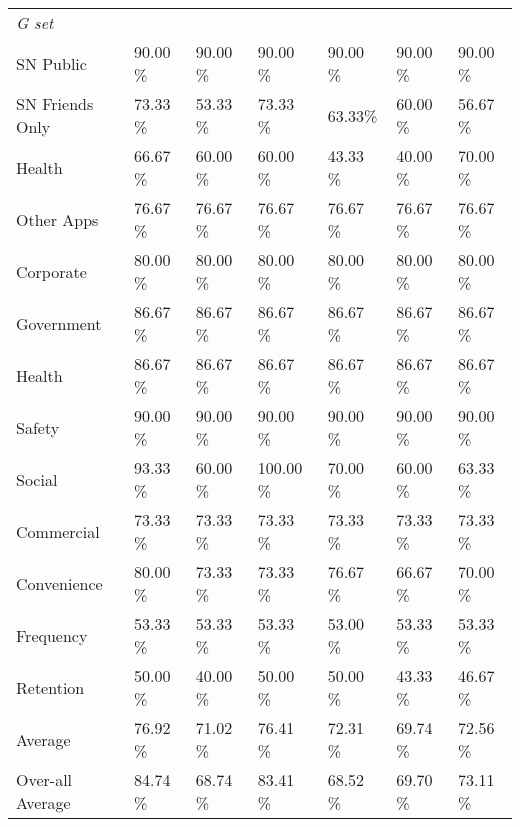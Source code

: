 \begin{appendices}
\begin{table*}
\begin{tabular}{P{2.5cm}P{1.7cm}P{1.6cm}P{1.5cm}P{1.5cm}P{1.5cm}P{1.9cm}}
\textit{G set}\\
SN Public &90.00 \% &90.00 \% &90.00 \%  & 90.00 \% &90.00 \% &90.00 \%\\
SN Friends Only &73.33 \% &53.33 \% &73.33 \% & 63.33\% &60.00 \% &56.67 \%\\
Health &66.67 \% &60.00 \% &60.00 \%  & 43.33 \% &40.00 \% &70.00 \%\\
Other Apps &76.67 \% &76.67 \% &76.67 \% & 76.67 \% & 76.67 \% &76.67 \%\\
Corporate & 80.00 \% & 80.00 \% & 80.00 \% & 80.00 \% & 80.00 \% & 80.00 \%\\
Government &86.67 \% & 86.67 \% &86.67 \% & 86.67 \% & 86.67 \% &86.67 \%\\
Health &86.67 \% &86.67 \% &86.67 \% & 86.67 \% & 86.67 \% &86.67 \%\\
Safety &90.00 \% & 90.00 \% & 90.00 \%  & 90.00 \% & 90.00 \% &90.00 \%\\
Social &93.33 \% &60.00 \% &100.00 \% & 70.00 \% & 60.00 \% &63.33 \%\\
Commercial & 73.33 \% & 73.33 \% & 73.33 \% & 73.33 \% & 73.33 \%&73.33 \%\\
Convenience & 80.00 \% & 73.33 \% &73.33 \% & 76.67 \% & 66.67 \% & 70.00 \%\\
Frequency & 53.33 \% & 53.33 \% &53.33 \% & 53.00 \% & 53.33 \% & 53.33 \%\\
Retention &50.00 \% & 40.00 \% & 50.00 \% & 50.00 \% & 43.33 \% & 46.67 \%\\

\cmidrule(r){2-7}
Average & 76.92 \% & 71.02 \% & 76.41 \% & 72.31 \% & 69.74 \% & 72.56 \%\\
\cmidrule(r){1-7}
Over-all Average & 84.74 \% & 68.74 \% & 83.41 \% & 68.52 \% & 69.70 \% & 73.11 \%  \\
\end{tabular}
\end{table*}






    

   

\end{appendices}
